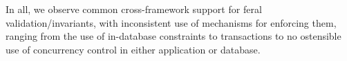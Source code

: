  In all, we observe common cross-framework support
for feral validation/invariants, with inconsistent use of mechanisms
for enforcing them, ranging from the use of in-database constraints to
transactions to no ostensible use of concurrency control in either
application or database.


